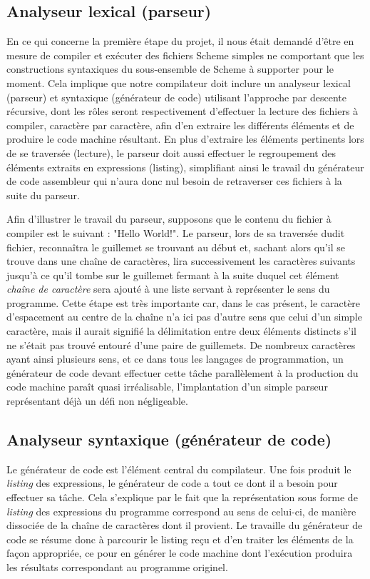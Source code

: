 \documentclass[12pt]{article}
\begin{document}
\subsection{Analyseur lexical (parseur)}
En ce qui concerne la première étape du projet, il nous était demandé d'être en mesure de compiler et exécuter des fichiers Scheme simples ne comportant que les constructions syntaxiques du sous-ensemble de Scheme à supporter pour le moment. Cela implique que notre compilateur doit inclure un analyseur lexical (parseur) et syntaxique (générateur de code) utilisant l'approche par descente récursive, dont les rôles seront respectivement d'effectuer la lecture des fichiers à compiler, caractère par caractère, afin d'en extraire les différents éléments et de produire le code machine résultant. En plus d'extraire les éléments pertinents lors de se traversée (lecture), le parseur doit aussi effectuer le regroupement des éléments extraits en expressions (listing), simplifiant ainsi le travail du générateur de code assembleur qui n'aura donc nul besoin de retraverser ces fichiers à la suite du parseur.

Afin d'illustrer le travail du parseur, supposons que le contenu du fichier à compiler est le suivant : "Hello World!". Le parseur, lors de sa traversée dudit fichier, reconnaîtra le guillemet se trouvant au début et, sachant alors qu'il se trouve dans une chaîne de caractères, lira successivement les caractères suivants jusqu'à ce qu'il tombe sur le guillemet fermant à la suite duquel cet élément \textit{chaîne de caractère} sera ajouté à une liste servant à représenter le sens du programme. Cette étape est très importante car, dans le cas présent, le caractère d'espacement au centre de la chaîne n'a ici pas d'autre sens que celui d'un simple caractère, mais il aurait signifié la délimitation entre deux éléments distincts s'il ne s'était pas trouvé entouré d'une paire de guillemets. De nombreux caractères ayant ainsi plusieurs sens, et ce dans tous les langages de programmation, un générateur de code devant effectuer cette tâche parallèlement à la production du code machine paraît quasi irréalisable, l'implantation d'un simple parseur représentant déjà un défi non négligeable.

\subsection{Analyseur syntaxique (générateur de code)}
Le générateur de code est l'élément central du compilateur. Une fois produit le \textit{listing} des expressions, le générateur de code a tout ce dont il a besoin pour effectuer sa tâche. Cela s'explique par le fait que la représentation sous forme de \textit{listing} des expressions du programme correspond au sens de celui-ci, de manière dissociée de la chaîne de caractères dont il provient. Le travaille du générateur de code se résume donc à parcourir le listing reçu et d'en traiter les éléments de la façon appropriée, ce pour en générer le code machine dont l'exécution produira les résultats correspondant au programme originel.
\end{document}
